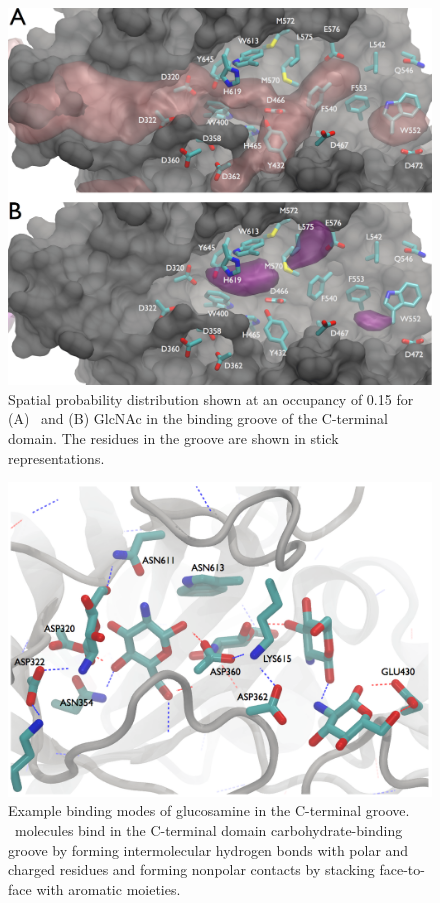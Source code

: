 \begin{figure}[htbp]
\centering
\includegraphics[width=6.25in]{figures/results4/cterm_groove_surf3.pdf}
\caption[Spatial probability densities of GlcNAc and GlcNH3+ in the C-terminal groove]{Spatial probability distribution shown at an occupancy of 0.15 for (A) \glucosamine\ and (B) GlcNAc in the binding groove of the C-terminal domain. The residues in the groove are shown in stick representations.}
\label{fig:groove}
\end{figure}

\begin{figure}[htbp]
\centering
\includegraphics[width=6.25in]{figures/results4/glucosamine_groove_binding_modes.png}
\caption[Example of glucosamine molecules binding in the C-terminal groove] {Example binding modes of glucosamine in the C-terminal groove. \glucosamine\ molecules bind in the C-terminal domain carbohydrate-binding groove by forming intermolecular hydrogen bonds with polar and charged residues and forming nonpolar contacts by stacking face-to-face with aromatic moieties.}
\label{fig:glucosamine_binding_modes_c_term}
\end{figure}

